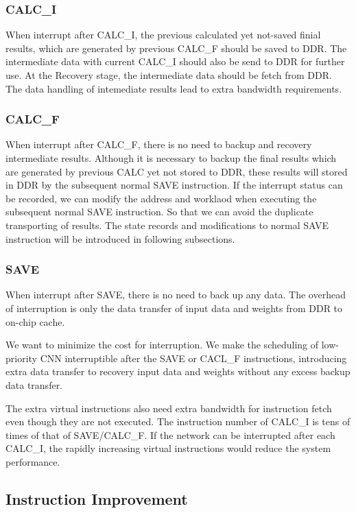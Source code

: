 \subsubsection{CALC\_I} 
When interrupt after CALC\_I, the previous calculated yet not-saved finial results, which are generated by previous CALC\_F should be saved to DDR. The intermediate data with current CALC\_I should also be send to DDR for further use. At the Recovery stage, the intermediate data should be fetch from DDR. The data handling of intemediate results lead to extra bandwidth requirements.


\subsubsection{CALC\_F}
When interrupt after CALC\_F, there is no need to backup and recovery intermediate results. Although it is necessary to backup the final results which are generated by previous CALC yet not stored to DDR, these results will stored in DDR by the subsequent normal SAVE instruction. If the interrupt status can be recorded, we can modify the address and worklaod when executing the subsequent normal SAVE instruction. So that we can avoid the duplicate transporting of results. The state records and modifications to normal SAVE instruction will be introduced in following subsections.

\subsubsection{SAVE}
When interrupt after SAVE, there is no need to back up any data. The overhead of interruption is only the data transfer of input data and weights from DDR to on-chip cache.

We want to minimize the cost for interruption. We make the scheduling of low-priority CNN interruptible after the SAVE or CACL\_F instructions, introducing extra data transfer to recovery input data and weights without any excess backup data transfer.

The extra virtual instructions also need extra bandwidth for instruction fetch even though they are not executed. The instruction number of CALC\_I is tens of times of that of SAVE/CALC\_F. If the network can be interrupted after each CALC\_I, the rapidly increasing virtual instructions would reduce the system performance.

\subsection{ Instruction Improvement }
\label{sec:virtualinstr}


